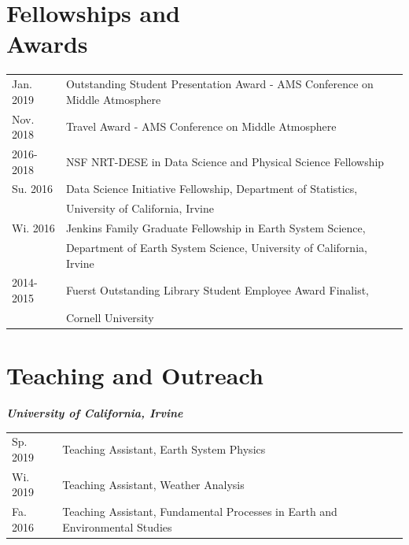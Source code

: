 \documentclass[margin,line,palatino,courier,10pt]{res}
\begin{document}
\begin{resume}
\section{\sc \textcolor{Cerulean}{\large{\textbf{Fellowships and\\ Awards}}}}
\begin{tabular}{@{}p{0.9in}p{4in}}
Jan. 2019 & Outstanding Student Presentation Award - AMS Conference on Middle Atmosphere\\
Nov. 2018 & Travel Award - AMS Conference on Middle Atmosphere\\
2016-2018 & NSF NRT-DESE in Data Science and Physical Science Fellowship\\
Su. 2016 & Data Science Initiative Fellowship, Department of Statistics, \\
& University of California, Irvine\\
Wi. 2016 & Jenkins Family Graduate Fellowship in Earth System Science,\\ 
& Department of Earth System
Science, University of California, Irvine\\
2014-2015 & Fuerst Outstanding Library Student Employee Award Finalist,\\
& Cornell University
\end{tabular}


\vspace{-0.1in}
\noindent\textcolor{Cerulean}{\makebox[\linewidth][r]{\rule{\textwidth}{5pt}}}
\vspace{-0.3in}

\section{\sc \textcolor{Cerulean}{\large{\textbf{Teaching and Outreach}}}}

\textit{\textbf{University of California, Irvine}}
\vspace*{0.05in}\\
\begin{tabular}{@{}p{0.9in}p{4in}}
Sp. 2019 & Teaching Assistant, Earth System Physics\\
Wi. 2019 & Teaching Assistant, Weather Analysis\\
Fa. 2016 & Teaching Assistant, Fundamental Processes in Earth and Environmental Studies\\
\end{tabular}


\end{resume}
\end{document}
